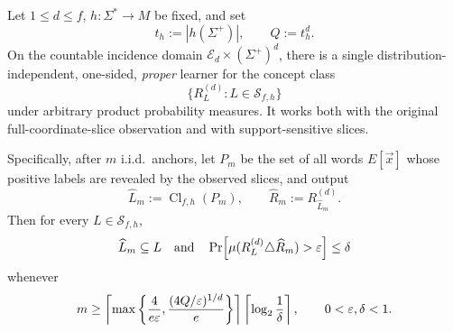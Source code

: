 \begin{theorem}
\label{thm:direct-proper-semantic-pac}
Let \(1\le d\le f\), \(h:\Sigma^*\to M\) be fixed, and set
\[
 t_h:=|h(\Sigma^+)|,\qquad Q:=t_h^d.
\]
On the countable incidence domain
\(\mathcal E_d\times(\Sigma^+)^d\), there is a single
distribution-independent, one-sided, \emph{proper} learner
for the concept class
\[
 \{R_L^{(d)}:L\in\mathcal S_{f,h}\}
\]
under arbitrary product probability measures.  It works
both with the original full-coordinate-slice observation
and with support-sensitive slices.

Specifically, after \(m\) i.i.d.\ anchors, let \(P_m\)
be the set of all words \(E[\vec x]\) whose positive labels
are revealed by the observed slices, and output
\[
 \widehat L_m:=\operatorname{Cl}_{f,h}(P_m),
 \qquad
 \widehat R_m:=R_{\widehat L_m}^{(d)}.
\]
Then for every \(L\in\mathcal S_{f,h}\),
\[
 \widehat L_m\subseteq L
 \quad\text{and}\quad
 \Pr\!\left[
 \mu(R_L^{(d)}\triangle\widehat R_m)>\varepsilon
 \right]\le\delta
\]
whenever
\[
 m\ge
 \left\lceil
 \max\left\{
 \frac{4}{e\varepsilon},
 \frac{(4Q/\varepsilon)^{1/d}}{e}
 \right\}
 \right\rceil
 \left\lceil\log_2\frac1\delta\right\rceil,
 \qquad 0<\varepsilon,\delta<1.
\]
\end{theorem}

